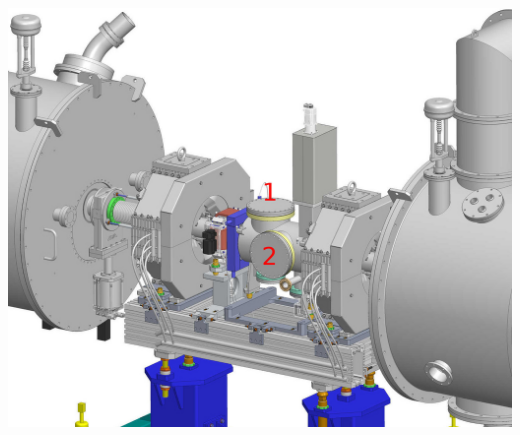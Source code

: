 \begin{frame}[t]
\begin{columns}[T]
\begin{column}{0.45\textwidth}
      \includegraphics[width=\textwidth]{03_SIM/fig/fig016_LWU_Cryo6}
    \end{column}
  \end{columns}
\end{frame}

